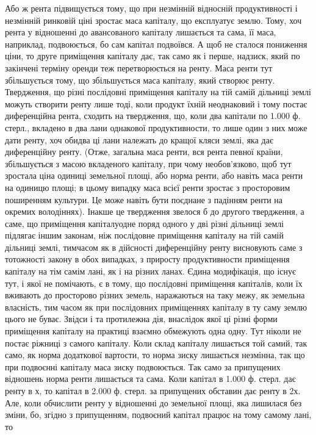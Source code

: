 Або ж рента підвищується тому, що при незмінній відносній продуктивності
і незмінній ринковій ціні зростає маса капіталу, що експлуатує землю.
Тому, хоч рента у відношенні до авансованого капіталу лишається та сама, її
маса, наприклад, подвоюється, бо сам капітал подвоївся. А щоб не сталося
пониження ціни, то друге приміщення капіталу дає, так само як і перше,
надзиск, який по закінчені терміну оренди теж перетворюється на ренту. Маса
ренти тут збільшується тому, що збільшується маса капіталу, який створює
ренту. Твердження, що різні послідовні приміщення капіталу на тій самій дільниці
землі можуть створити ренту лише тоді, коли продукт їхній неоднаковий
і тому постає диференційна рента, сходить на твердження, що, коли два капітали
по 1.000 ф. стерл., вкладено в два лани однакової продуктивности, то
лише один з них може дати ренту, хоч обидва ці лани належать до кращої
кляси землі, яка дає диференційну ренту. (Отже, загальна маса ренти, вся
рента певної країни, збільшується з масою вкладеного капіталу, при чому
необов’язково, щоб тут зростала ціна одиниці земельної площі, або норма
ренти, або навіть маса ренти на одиницю площі; в цьому випадку маса
всієї ренти зростає з просторовим поширенням культури. Це може навіть
бути поєднане з падінням ренти на окремих володіннях). Інакше це твердження
звелося б до другого твердження, а саме, що приміщення капіталуодне
поряд одного у дві різні дільниці землі підлягає іншим законам, ніж послідовне
приміщення капіталу на тій самій дільниці землі, тимчасом як в дійсності
диференційну ренту висновують саме з тотожності закону в обох випадках,
з приросту продуктивности приміщення капіталу на тім самім лані, як і на
різних ланах. Єдина модифікація, що існує тут, і якої не помічають, є в тому,
що послідовні приміщення капіталів, коли їх вживають до просторово різних
земель, наражаються на таку межу, як земельна власність, тим часом як при послідовних
приміщеннях капіталу в ту саму землю цього не буває. Звідси і та
протилежна дія, внаслідок якої ці різні форми приміщення капіталу на практиці
взаємно обмежують одна одну. Тут ніколи не постає ріжниці з самого капіталу.
Коли склад капіталу лишається той самий, так само, як норма додаткової
вартости, то норма зиску лишається незмінна, так що при подвоєнні
капіталу маса зиску подвоюється. Так само за припущених відношень норма
ренти лишається та сама. Коли капітал в 1.000 ф. стерл. дає ренту в х, то
капітал в 2.000 ф. стерл. за припущених обставин дає ренту в 2х. Але, коли
обчислити ренту у відношенні до земельної площі, яка лишилася без зміни, бо,
згідно з припущенням, подвоєний капітал працює на тому самому лані, то
\parbreak{}  %
